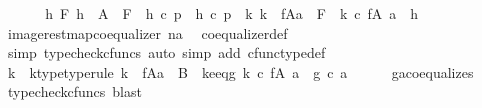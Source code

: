 \begin{isabellebody}
\ \ \isamarkupfalse%
\isanewline
\isanewline
\ \ \isamarkupfalse%
\ {\isachardoublequoteopen}{\isasymforall}h\ F{\isachardot}{\kern0pt}\ h\ {\isacharcolon}{\kern0pt}\ A\ {\isasymrightarrow}\ F\ {\isasymand}\ h\ {\isasymcirc}\isactrlsub c\ p{}\ {\isacharequal}{\kern0pt}\ h\ {\isasymcirc}\isactrlsub c\ p{}\ {\isasymlongrightarrow}\ {\isacharparenleft}{\kern0pt}{\isasymexists}{\isacharbang}{\kern0pt}k{\isachardot}{\kern0pt}\ k\ {\isacharcolon}{\kern0pt}\ f{\isasymlparr}A{\isasymrparr}\isactrlbsub a\isactrlesub \ {\isasymrightarrow}\ F\ {\isasymand}\ k\ {\isasymcirc}\isactrlsub c\ f{\isasymrestriction}\isactrlbsub {\isacharparenleft}{\kern0pt}A{\isacharcomma}{\kern0pt}\ a{\isacharparenright}{\kern0pt}\isactrlesub \ {\isacharequal}{\kern0pt}\ h{\isacharparenright}{\kern0pt}{\isachardoublequoteclose}\isanewline
\ \ \ \ \isamarkupfalse%
\ image{\isacharunderscore}{\kern0pt}rest{\isacharunderscore}{\kern0pt}map{\isacharunderscore}{\kern0pt}coequalizer{\isacharbrackleft}{\kern0pt}\ n{\isacharequal}{\kern0pt}a{\isacharbrackright}{\kern0pt}\ \isamarkupfalse%
\ coequalizer{\isacharunderscore}{\kern0pt}def\ \isanewline
\ \ \ \ \isamarkupfalse%
\ {\isacharparenleft}{\kern0pt}simp{\isacharcomma}{\kern0pt}\ typecheck{\isacharunderscore}{\kern0pt}cfuncs{\isacharcomma}{\kern0pt}\ auto\ simp\ add{\isacharcolon}{\kern0pt}\ cfunc{\isacharunderscore}{\kern0pt}type{\isacharunderscore}{\kern0pt}def{\isacharparenright}{\kern0pt}\isanewline
\ \ \isamarkupfalse%
\ \isamarkupfalse%
\ k\ \ k{\isacharunderscore}{\kern0pt}type{\isacharbrackleft}{\kern0pt}type{\isacharunderscore}{\kern0pt}rule{\isacharbrackright}{\kern0pt}{\isacharcolon}{\kern0pt}\ {\isachardoublequoteopen}k\ {\isacharcolon}{\kern0pt}\ f{\isasymlparr}A{\isasymrparr}\isactrlbsub a\isactrlesub \ {\isasymrightarrow}\ B{\isachardoublequoteclose}\ \ k{\isacharunderscore}{\kern0pt}e{\isacharunderscore}{\kern0pt}eq{\isacharunderscore}{\kern0pt}g{\isacharcolon}{\kern0pt}\ {\isachardoublequoteopen}k\ {\isasymcirc}\isactrlsub c\ f{\isasymrestriction}\isactrlbsub {\isacharparenleft}{\kern0pt}A{\isacharcomma}{\kern0pt}\ a{\isacharparenright}{\kern0pt}\isactrlesub \ {\isacharequal}{\kern0pt}\ g\ {\isasymcirc}\isactrlsub c\ a{\isachardoublequoteclose}\isanewline
\ \ \ \ \isamarkupfalse%
\ ga{\isacharunderscore}{\kern0pt}coequalizes\ \isamarkupfalse%
\ {\isacharparenleft}{\kern0pt}typecheck{\isacharunderscore}{\kern0pt}cfuncs{\isacharcomma}{\kern0pt}\ blast{\isacharparenright}{\kern0pt}\isanewline

\end{isabellebody}
